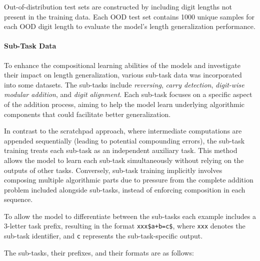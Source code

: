 Out-of-distribution test sets are constructed by including digit lengths not present in the training data. Each OOD test set contains 1000 unique samples for each OOD digit length to evaluate the model's length generalization performance.

\paragraph{Sub-Task Data}

To enhance the compositional learning abilities of the models and investigate their impact on length generalization, various sub-task data was incorporated into some datasets. The sub-tasks include \emph{reversing}, \emph{carry detection}, \emph{digit-wise modular addition}, and \emph{digit alignment}. Each sub-task focuses on a specific aspect of the addition process, aiming to help the model learn underlying algorithmic components that could facilitate better generalization.

In contrast to the scratchpad approach, where intermediate computations are appended sequentially (leading to potential compounding errors), the sub-task training treats each sub-task as an independent auxiliary task. This method allows the model to learn each sub-task simultaneously without relying on the outputs of other tasks. Conversely, sub-task training implicitly involves composing multiple algorithmic parts due to pressure from the complete addition problem included alongside sub-tasks, instead of enforcing composition in each sequence.

To allow the model to differentiate between the sub-tasks each example includes a 3-letter task prefix, resulting in the format \texttt{xxx\$a+b=c\$}, where \texttt{xxx} denotes the sub-task identifier, and \texttt{c} represents the sub-task-specific output.

The sub-tasks, their prefixes, and their formats are as follows:

